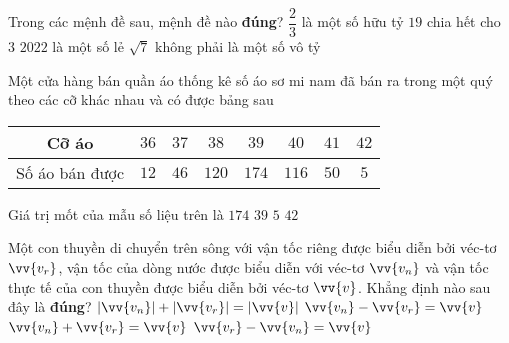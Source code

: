 \begin{ex}%
	Trong các mệnh đề sau, mệnh đề nào \textbf{đúng}?
	\choice
	{\True $\dfrac{2}{3}$ là một số hữu tỷ}
	{$19$ chia hết cho $3$}
	{$2022$ là một số lẻ}
	{$\sqrt{7}$ không phải là một số vô tỷ}
\end{ex}
\begin{ex}%
	Một cửa hàng bán quần áo thống kê số áo sơ mi nam đã bán ra trong một quý theo các cỡ khác nhau và có được bảng sau
	\begin{center}
		\begin{tabular}{|c|c|c|c|c|c|c|c|}
			\hline
			Cỡ áo&$36$&$37$&$38$&$39$&$40$&$41$&$42$\\
			\hline
			Số áo bán được&$12$&$46$&$120$&$174$&$116$&$50$&$5$\\
			\hline
		\end{tabular}
	\end{center}
	Giá trị mốt của mẫu số liệu trên là
	\choice
	{$174$}
	{\True $39$}
	{$5$}
	{$42$}
\end{ex}
\begin{ex}%
	Một con thuyền di chuyển trên sông với vận tốc riêng được biểu diễn bởi véc-tơ $\vv{v_r}$, vận tốc của dòng nước được biểu diễn với véc-tơ $\vv{v_n}$ và vận tốc thực tế của con thuyền được biểu diễn bởi véc-tơ $\vv{v}$. Khẳng định nào sau đây là \textbf{đúng}?
	\choice
	{$|\vv{v_n}|+|\vv{v_r}|=|\vv{v}|$}
	{$\vv{v_n}-\vv{v_r}=\vv{v}$}
	{\True $\vv{v_n}+\vv{v_r}=\vv{v}$}
	{$\vv{v_r}-\vv{v_n}=\vv{v}$}
\end{ex}
